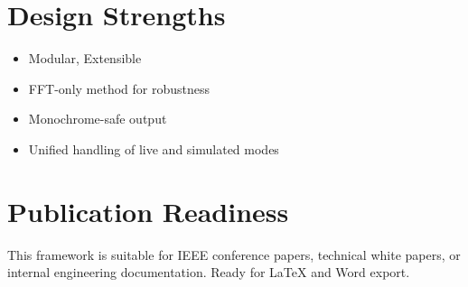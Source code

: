 \documentclass[conference]{IEEEtran}
\begin{document}
\section{Design Strengths}
\begin{itemize}
\item Modular, Extensible
\item FFT-only method for robustness
\item Monochrome-safe output
\item Unified handling of live and simulated modes
\end{itemize}

\section{Publication Readiness}
This framework is suitable for IEEE conference papers, technical white papers, or internal engineering documentation. Ready for LaTeX and Word export.



\end{document}
